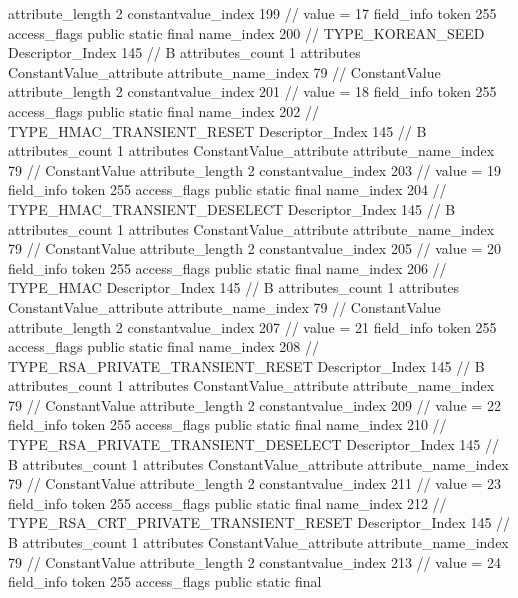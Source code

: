 {{{{{{{					attribute_length	2
					constantvalue_index	199		// value = 17
				}
				}
			}
			field_info {
				token	255
				access_flags	public static final
				name_index	200		// TYPE_KOREAN_SEED
				Descriptor_Index	145		// B
				attributes_count	1
				attributes {
				ConstantValue_attribute {
					attribute_name_index	79		// ConstantValue
					attribute_length	2
					constantvalue_index	201		// value = 18
				}
				}
			}
			field_info {
				token	255
				access_flags	public static final
				name_index	202		// TYPE_HMAC_TRANSIENT_RESET
				Descriptor_Index	145		// B
				attributes_count	1
				attributes {
				ConstantValue_attribute {
					attribute_name_index	79		// ConstantValue
					attribute_length	2
					constantvalue_index	203		// value = 19
				}
				}
			}
			field_info {
				token	255
				access_flags	public static final
				name_index	204		// TYPE_HMAC_TRANSIENT_DESELECT
				Descriptor_Index	145		// B
				attributes_count	1
				attributes {
				ConstantValue_attribute {
					attribute_name_index	79		// ConstantValue
					attribute_length	2
					constantvalue_index	205		// value = 20
				}
				}
			}
			field_info {
				token	255
				access_flags	public static final
				name_index	206		// TYPE_HMAC
				Descriptor_Index	145		// B
				attributes_count	1
				attributes {
				ConstantValue_attribute {
					attribute_name_index	79		// ConstantValue
					attribute_length	2
					constantvalue_index	207		// value = 21
				}
				}
			}
			field_info {
				token	255
				access_flags	public static final
				name_index	208		// TYPE_RSA_PRIVATE_TRANSIENT_RESET
				Descriptor_Index	145		// B
				attributes_count	1
				attributes {
				ConstantValue_attribute {
					attribute_name_index	79		// ConstantValue
					attribute_length	2
					constantvalue_index	209		// value = 22
				}
				}
			}
			field_info {
				token	255
				access_flags	public static final
				name_index	210		// TYPE_RSA_PRIVATE_TRANSIENT_DESELECT
				Descriptor_Index	145		// B
				attributes_count	1
				attributes {
				ConstantValue_attribute {
					attribute_name_index	79		// ConstantValue
					attribute_length	2
					constantvalue_index	211		// value = 23
				}
				}
			}
			field_info {
				token	255
				access_flags	public static final
				name_index	212		// TYPE_RSA_CRT_PRIVATE_TRANSIENT_RESET
				Descriptor_Index	145		// B
				attributes_count	1
				attributes {
				ConstantValue_attribute {
					attribute_name_index	79		// ConstantValue
					attribute_length	2
					constantvalue_index	213		// value = 24
				}
				}
			}
			field_info {
				token	255
				access_flags	public static final
}}}}}
